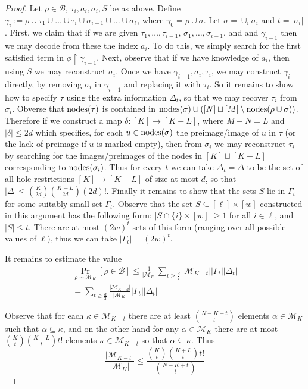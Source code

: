\begin{proof}
Let $\rho \in \mathcal{B}$, $\tau_i,a_i,\sigma_i, S$ be as above. Define $\gamma_{i}:=\rho \cup \tau_1 \cup \ldots \cup \tau_{i} \cup \sigma_{i+1} \cup \ldots \cup \sigma_{\ell}$, where $\gamma_0 = \rho \cup \sigma$. Let $\sigma=\cup_i\sigma_i$ and $t = |\sigma_i|$. First, we claim that if we are given $\tau_1,\ldots,\tau_{i-1}$, $\sigma_1,\ldots,\sigma_{i-1}$, and  and $\gamma_{i-1}$ then we may decode from these the index $a_i$. To do this, we simply search for the first satisfied term in $\phi \upharpoonright \gamma_{i-1}$. Next, observe that if we have knowledge of $a_i$, then using $S$ we may reconstruct $\sigma_i$. Once we have $\gamma_{i-1}, \sigma_i, \tau_i$, we may construct $\gamma_i$ directly, by removing $\sigma_i$ in $\gamma_{i-1}$ and replacing it with $\tau_i$. So it remains to show how to specify $\tau$ using the extra information $\Delta_t$, so that we may recover $\tau_i$ from $\sigma_i$. Obverse that $\mathrm{nodes}(\tau)$ is contained in $\mathrm{nodes}(\sigma) \cup ([N] \sqcup [M] \setminus \mathrm{nodes}(\rho \cup \sigma))$. Therefore if we construct a map $\delta: [K] \to [K + L]$, where $M-N=L$ and $|\delta| \leq 2d$ which specifies, for each $u \in \mathrm{nodes}(\sigma)$ the preimage/image of $u$ in $\tau$ (or the lack of preimage if $u$ is marked empty), then from $\sigma_i$ we may reconstruct $\tau_i$ by searching for the images/preimages of the nodes in $[K] \sqcup [K+L]$ corresponding to $\mathrm{nodes}(\sigma_i)$. Thus for every $t$ we can take $\Delta_t = \Delta$ to be the set of all hole restrictions $[K] \to [K+L]$ of size at most $d$, so that $|\Delta| \leq \binom{K}{2d}\binom{K+L}{2d}(2d)!$. Finally it remains to show that the sets $S$ lie in $\Gamma_t$ for some suitably small set $\Gamma_t$. Observe that the set $S \subseteq [\ell] \times [w]$ constructed in this argument has the following form: $|S \cap \{i\} \times [w]| \geq 1$ for all $i \in \ell$, and $|S| \leq t$. There are at most $(2w)^t$ sets of this form (ranging over all possible values of $\ell$), thus we can take $|\Gamma_t|= (2w)^t$.

It remains to estimate the value
\begin{gather*}
\Pr_{\rho \sim \mathcal{M}_{K}}[\rho \in \mathcal{B}] \leq \frac{1}{|\mathcal{M}_K|} \sum\limits_{t \geq \frac{d}{2}} |\mathcal{M}_{K-t}| |\Gamma_t| |\Delta_t| \\
=
\sum\limits_{t \geq \frac{d}{2}} \frac{|\mathcal{M}_{K-d}|}{|\mathcal{M}_K|}  |\Gamma_t| |\Delta_t|
\end{gather*}

Observe that for each $\kappa \in \mathcal{M}_{K-t}$ there are at least $\binom{N-K+t}{t}$ elements $\alpha \in \mathcal{M}_{K}$ such that $\alpha \subseteq \kappa$, and on the other hand for any $\alpha \in \mathcal{M}_{K}$ there are at most $\binom{K}{t}\binom{K+L}{t}t!$ elements $\kappa \in \mathcal{M}_{K-t}$ so that $\alpha \subseteq \kappa$. Thus
\[
\frac{ |\mathcal{M}_{K-t}|}{|\mathcal{M}_K|} \leq \frac{\binom{K}{t}\binom{K+L}{t}t!}{\binom{N-K+t}{t}} 
\]


\end{proof}
